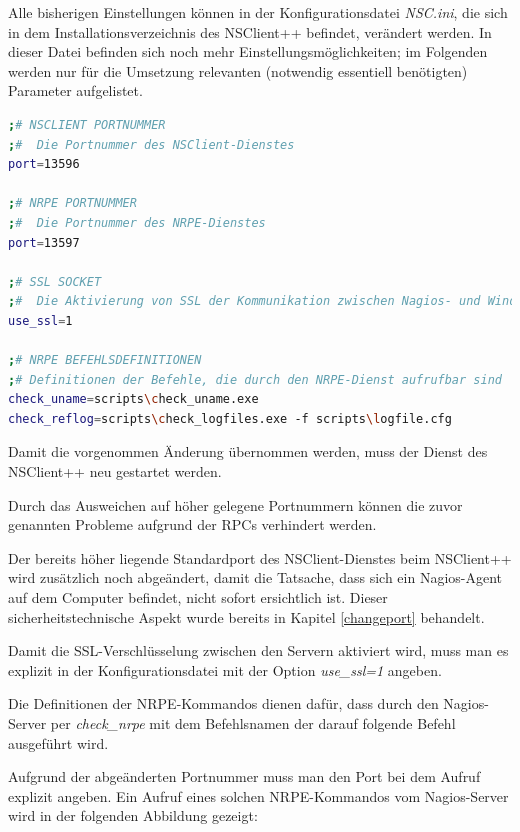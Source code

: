 Alle bisherigen Einstellungen können in der Konfigurationsdatei \textit{NSC.ini}, die sich in dem Installationsverzeichnis des NSClient++ befindet, verändert werden.
In dieser Datei befinden sich noch mehr Einstellungsmöglichkeiten; im Folgenden werden nur für die Umsetzung relevanten (notwendig essentiell benötigten) Parameter aufgelistet.

\begin{lstlisting}[captionpos=b, caption=NSClient++ Konfigurationsdatei, label=code:nsc, breaklines = true, language=sh]
;# NSCLIENT PORTNUMMER
;#  Die Portnummer des NSClient-Dienstes
port=13596

;# NRPE PORTNUMMER
;#  Die Portnummer des NRPE-Dienstes
port=13597

;# SSL SOCKET
;#  Die Aktivierung von SSL der Kommunikation zwischen Nagios- und Windows-Server 
use_ssl=1

;# NRPE BEFEHLSDEFINITIONEN
;# Definitionen der Befehle, die durch den NRPE-Dienst aufrufbar sind
check_uname=scripts\check_uname.exe
check_reflog=scripts\check_logfiles.exe -f scripts\logfile.cfg
\end{lstlisting}

Damit die vorgenommen Änderung übernommen werden, muss der Dienst des NSClient++ neu gestartet werden. 


Durch das Ausweichen auf höher gelegene Portnummern können die zuvor genannten Probleme aufgrund der \gls{RPC}s verhindert werden.

Der bereits höher liegende Standardport des NSClient-Dienstes beim NSClient++ wird zusätzlich noch abgeändert, damit die Tatsache, dass sich ein Nagios-Agent auf dem Computer befindet, nicht sofort ersichtlich ist.
Dieser sicherheitstechnische Aspekt wurde bereits in Kapitel \ref{changeport} behandelt.

Damit die \gls{SSL}-Verschlüsselung zwischen den Servern aktiviert wird, muss man es explizit in der Konfigurationsdatei mit der Option \textit{use\_ssl=1} angeben.

Die Definitionen der \gls{NRPE}-Kommandos dienen dafür, dass durch den Nagios-Server per \textit{check\_nrpe} mit dem Befehlsnamen der darauf folgende Befehl ausgeführt wird.

Aufgrund der abgeänderten Portnummer muss man den Port bei dem Aufruf explizit angeben.
Ein Aufruf eines solchen \gls{NRPE}-Kommandos vom Nagios-Server wird in der folgenden Abbildung gezeigt:


